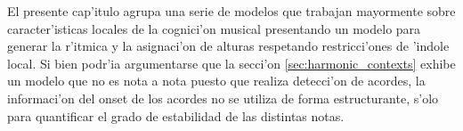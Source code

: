 El presente cap'itulo agrupa una serie de modelos que trabajan mayormente sobre caracter'isticas locales de la cognici'on musical presentando un modelo para generar 
la r'itmica y la asignaci'on de alturas respetando restricci'ones de 'indole local.
Si bien podr'ia argumentarse que la secci'on \ref{sec:harmonic_contexts} exhibe un modelo que no es nota a nota puesto que realiza detecci'on de acordes, la informaci'on
del onset de los acordes no se utiliza de forma estructurante, s'olo para quantificar el grado de estabilidad de las distintas notas. 
